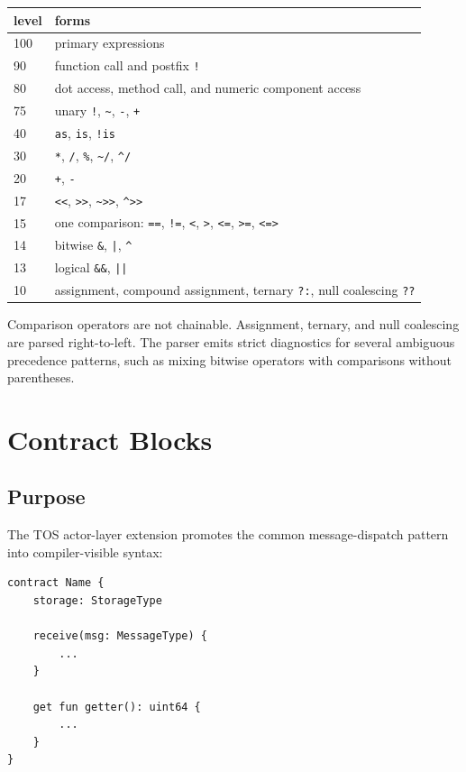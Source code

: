 \documentclass[12pt,oneside]{article}
\begin{document}
\begin{center}
\begin{tabular}{|l|m{}|}
\hline
level & forms \\ \hline
100 & primary expressions \\ \hline
90 & function call and postfix \verb|!| \\ \hline
80 & dot access, method call, and numeric component access \\ \hline
75 & unary \verb|!|, \verb|~|, \verb|-|, \verb|+| \\ \hline
40 & \verb|as|, \verb|is|, \verb|!is| \\ \hline
30 & \verb|*|, \verb|/|, \verb|%|, \verb|~/|, \verb|^/| \\ \hline
20 & \verb|+|, \verb|-| \\ \hline
17 & \verb|<<|, \verb|>>|, \verb|~>>|, \verb|^>>| \\ \hline
15 & one comparison: \verb|==|, \verb|!=|, \verb|<|, \verb|>|,
\verb|<=|, \verb|>=|, \verb|<=>| \\ \hline
14 & bitwise \verb|&|, \verb+|+, \verb|^| \\ \hline
13 & logical \verb|&&|, \verb+||+ \\ \hline
10 & assignment, compound assignment, ternary \verb|?:|, null coalescing
\verb|??| \\ \hline
\end{tabular}
\end{center}

Comparison operators are not chainable. Assignment, ternary, and null
coalescing are parsed right-to-left. The parser emits strict diagnostics for
several ambiguous precedence patterns, such as mixing bitwise operators with
comparisons without parentheses.

\section{Contract Blocks}
\label{sec:contracts}
\subsection{Purpose}
The TOS actor-layer extension promotes the common message-dispatch pattern into
compiler-visible syntax:

\begin{verbatim}
contract Name {
    storage: StorageType

    receive(msg: MessageType) {
        ...
    }

    get fun getter(): uint64 {
        ...
    }
}
\end{verbatim}
\end{document}
